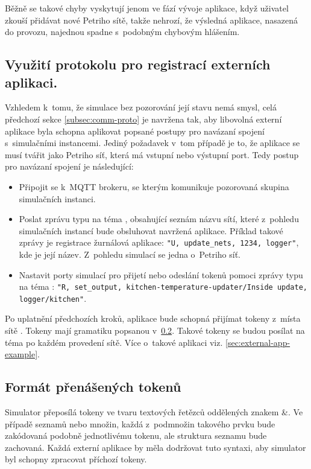 Běžně se takové chyby vyskytují jenom ve fází vývoje aplikace, když uživatel zkouší přidávat nové Petriho sítě, takže nehrozí, že výsledná aplikace, nasazená do provozu, najednou spadne s~podobným chybovým hlášením.

\subsection{Využití protokolu pro registrací externích aplikaci.}
\label{subsec:external-app}

Vzhledem k~tomu, že simulace bez pozorování její stavu nemá smysl, celá předchozí sekce \ref{subsec:comm-proto} je navržena tak, aby libovolná externí aplikace byla schopna aplikovat popsané postupy pro navázaní spojení s~simulačními instancemi. Jediný požadavek v~tom případě je to, že aplikace se musí tvářit jako Petriho síť, která má vstupní nebo výstupní port. Tedy postup pro navázaní spojení je následující:
\begin{itemize}
  \item Připojit se k~MQTT brokeru, se kterým komunikuje pozorovaná skupina simulačních instanci.
  \item Poslat zprávu typu  na téma , obsahující seznám názvu sítí, které z~pohledu simulačních instancí bude obsluhovat navržená aplikace. Příklad takové zprávy je registrace žurnálová aplikace: \texttt{"U, update\_nets, 1234, logger"}, kde  je její název. Z~pohledu simulací se jedna o~Petriho síť.
  \item Nastavit porty simulací pro přijetí nebo odeslání tokenů pomoci zprávy typu  na téma : \texttt{"R, set\_output, kitchen-temperature-updater/Inside update, logger/kitchen"}.
\end{itemize}

Po uplatnění předchozích kroků, aplikace bude schopná přijímat tokeny z~místa  sítě . Tokeny mají gramatiku popsanou v~\ref{subsec:token-format}. Takové tokeny se budou posílat na téma  po každém provedení sítě. Více o~takové aplikaci viz. \ref{sec:external-app-example}.

\subsection{Formát přenášených tokenů}
\label{subsec:token-format}

Simulator přeposílá tokeny ve tvaru textových řetězců  oddělených znakem \&. Ve případě seznamů nebo množin, každá z~podmnožin takového prvku bude zakódovaná podobně jednotlivému tokenu, ale struktura seznamu bude zachovaná. Každá externí aplikace by měla dodržovat tuto syntaxi, aby simulator byl schopny zpracovat příchozí tokeny.

